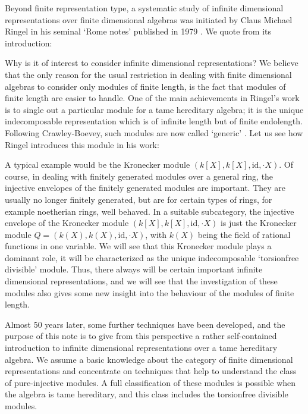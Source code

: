 \documentclass[a4paper]{amsart}
\theoremstyle{plain}
\theoremstyle{definition}
\theoremstyle{remark}
\numberwithin{equation}{section}
\renewenvironment{quote}{%
  \list{}{%
    \leftmargin5ex   %
    \rightmargin\leftmargin
  }
  \item\relax
}
{\endlist}
\begin{document}
Beyond finite representation type, a systematic study of
infinite dimensional representations over finite dimensional algebras was
initiated by Claus Michael Ringel in his seminal `Rome notes'
published in 1979 \cite{Ri1979}. We quote from its introduction:
\begin{quote}
  Why is it of interest to consider infinite dimensional
  representations? We believe that the only reason for the usual
  restriction in dealing with finite dimensional algebras to consider
  only modules of finite length, is the fact that modules of finite
  length are easier to handle.
\end{quote}
 One of the main achievements in Ringel's work is to single out a
particular module for a tame hereditary algebra; it is the unique
indecomposable representation which is of infinite length but of
finite endolength.  Following Crawley-Boevey, such modules are now
called `generic' \cite{CB1992}. Let us see how Ringel introduces this
module in his work:
\begin{quote}
  A typical example would be the Kronecker module
  $(k[X], k[X], \text{id}, \cdot X)$. Of course, in dealing with
  finitely generated modules over a general ring, the injective
  envelopes of the finitely generated modules are important. They are
  usually no longer finitely generated, but are for certain types of
  rings, for example noetherian rings, well behaved. In a suitable
  subcategory, the injective envelope of the Kronecker module $(k[X],
  k[X], \text{id}, \cdot X)$ is just the Kronecker module $Q = (k(X),
  k(X), \text{id}, \cdot X)$,
  with $k(X)$ being the field of rational functions in one variable. We
  will see that this Kronecker module plays a dominant role, it will
  be characterized as the unique indecomposable `torsionfree
  divisible' module. Thus, there always will be certain important
  infinite dimensional representations, and we will see that the
  investigation of these modules also gives some new insight into the
  behaviour of the modules of finite length.
\end{quote}

Almost 50 years later, some further techniques have been developed,
and the purpose of this note is to give from this perspective a rather
self-contained introduction to infinite dimensional representations
over a tame hereditary algebra. We assume a basic knowledge about
the category of finite dimensional representations and concentrate on
techniques that help to understand the class of pure-injective
modules. A full classification of these modules is possible when the
algebra is tame hereditary, and this class includes the torsionfree
divisible modules.
\end{document}
